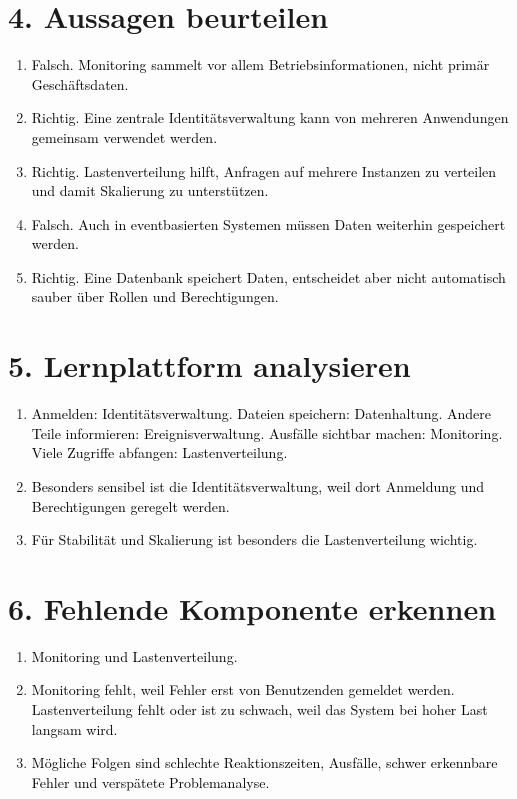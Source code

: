 \documentclass[11pt,a4paper]{article}
\newcommand{\solution}[1]{\textcolor{black}{#1}}
\begin{document}
\section*{4. Aussagen beurteilen}
\begin{enumerate}
  \item \solution{Falsch. Monitoring sammelt vor allem Betriebsinformationen, nicht primär Geschäftsdaten.}
  \item \solution{Richtig. Eine zentrale Identitätsverwaltung kann von mehreren Anwendungen gemeinsam verwendet werden.}
  \item \solution{Richtig. Lastenverteilung hilft, Anfragen auf mehrere Instanzen zu verteilen und damit Skalierung zu unterstützen.}
  \item \solution{Falsch. Auch in eventbasierten Systemen müssen Daten weiterhin gespeichert werden.}
  \item \solution{Richtig. Eine Datenbank speichert Daten, entscheidet aber nicht automatisch sauber über Rollen und Berechtigungen.}
\end{enumerate}

\section*{5. Lernplattform analysieren}
\begin{enumerate}
  \item \solution{Anmelden: Identitätsverwaltung. Dateien speichern: Datenhaltung. Andere Teile informieren: Ereignisverwaltung. Ausfälle sichtbar machen: Monitoring. Viele Zugriffe abfangen: Lastenverteilung.}
  \item \solution{Besonders sensibel ist die Identitätsverwaltung, weil dort Anmeldung und Berechtigungen geregelt werden.}
  \item \solution{Für Stabilität und Skalierung ist besonders die Lastenverteilung wichtig.}
\end{enumerate}

\section*{6. Fehlende Komponente erkennen}
\begin{enumerate}
  \item \solution{Monitoring und Lastenverteilung.}
  \item \solution{Monitoring fehlt, weil Fehler erst von Benutzenden gemeldet werden. Lastenverteilung fehlt oder ist zu schwach, weil das System bei hoher Last langsam wird.}
  \item \solution{Mögliche Folgen sind schlechte Reaktionszeiten, Ausfälle, schwer erkennbare Fehler und verspätete Problemanalyse.}
\end{enumerate}
\end{document}
